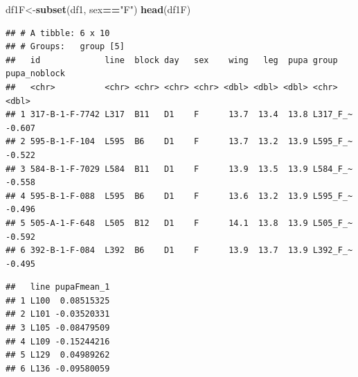 \documentclass[
]{article}
\newenvironment{Shaded}{\begin{snugshade}}{\end{snugshade}}
\newcommand{\DecValTok}[1]{\textcolor[rgb]{0.00,0.00,0.81}{#1}}
\newcommand{\KeywordTok}[1]{\textcolor[rgb]{0.13,0.29,0.53}{\textbf{#1}}}
\newcommand{\NormalTok}[1]{#1}
\newcommand{\OperatorTok}[1]{\textcolor[rgb]{0.81,0.36,0.00}{\textbf{#1}}}
\newcommand{\StringTok}[1]{\textcolor[rgb]{0.31,0.60,0.02}{#1}}
\begin{document}
\begin{Shaded}
\begin{Highlighting}[]
\NormalTok{df1F<-}\KeywordTok{subset}\NormalTok{(df1, sex}\OperatorTok{==}\StringTok{"F"}\NormalTok{)}
\KeywordTok{head}\NormalTok{(df1F)}
\end{Highlighting}
\end{Shaded}

\begin{verbatim}
## # A tibble: 6 x 10
## # Groups:   group [5]
##   id             line  block day   sex    wing   leg  pupa group    pupa_noblock
##   <chr>          <chr> <chr> <chr> <chr> <dbl> <dbl> <dbl> <chr>           <dbl>
## 1 317-B-1-F-7742 L317  B11   D1    F      13.7  13.4  13.8 L317_F_~       -0.607
## 2 595-B-1-F-104  L595  B6    D1    F      13.7  13.2  13.9 L595_F_~       -0.522
## 3 584-B-1-F-7029 L584  B11   D1    F      13.9  13.5  13.9 L584_F_~       -0.558
## 4 595-B-1-F-088  L595  B6    D1    F      13.6  13.2  13.9 L595_F_~       -0.496
## 5 505-A-1-F-648  L505  B12   D1    F      14.1  13.8  13.9 L505_F_~       -0.592
## 6 392-B-1-F-084  L392  B6    D1    F      13.9  13.7  13.9 L392_F_~       -0.495
\end{verbatim}

\begin{Shaded}
\end{Shaded}

\begin{verbatim}
##   line pupaFmean_1
## 1 L100  0.08515325
## 2 L101 -0.03520331
## 3 L105 -0.08479509
## 4 L109 -0.15244216
## 5 L129  0.04989262
## 6 L136 -0.09580059
\end{verbatim}

\begin{Shaded}
\end{Shaded}
\end{document}
